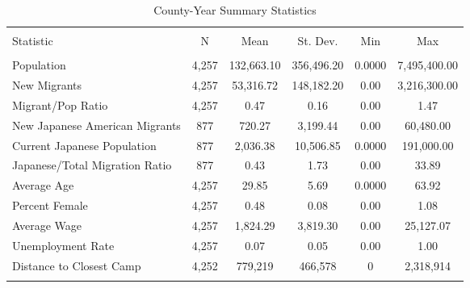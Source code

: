 
\begin{table}[!htbp] \centering 
  \caption{County-Year Summary Statistics} 
  \label{ctysumstats} 
\begin{tabular}{@{\extracolsep{5pt}}lccccc} 
\\[-1.8ex]\hline 
\hline \\[-1.8ex] 
Statistic & \multicolumn{1}{c}{N} & \multicolumn{1}{c}{Mean} & \multicolumn{1}{c}{St. Dev.} & \multicolumn{1}{c}{Min} & \multicolumn{1}{c}{Max} \\ 
\hline \\[-1.8ex] 
Population & 4,257 & 132,663.10 & 356,496.20 & 0.0000 & 7,495,400.00 \\ 
New Migrants & 4,257 & 53,316.72 & 148,182.20 & 0.00 & 3,216,300.00 \\ 
Migrant/Pop Ratio & 4,257 & 0.47 & 0.16 & 0.00 & 1.47 \\ 
New Japanese American Migrants & 877 & 720.27 & 3,199.44 & 0.00 & 60,480.00 \\ 
Current Japanese Population & 877 & 2,036.38 & 10,506.85 & 0.0000 & 191,000.00 \\ 
Japanese/Total Migration Ratio & 877 & 0.43 & 1.73 & 0.00 & 33.89 \\ 
Average Age & 4,257 & 29.85 & 5.69 & 0.0000 & 63.92 \\ 
Percent Female & 4,257 & 0.48 & 0.08 & 0.00 & 1.08 \\ 
Average Wage & 4,257 & 1,824.29 & 3,819.30 & 0.00 & 25,127.07 \\ 
Unemployment Rate & 4,257 & 0.07 & 0.05 & 0.00 & 1.00 \\ 
Distance to Closest Camp & 4,252 & 779,219 & 466,578 & 0 & 2,318,914\\ 
\hline \\[-1.8ex] 
\end{tabular} 
\end{table} 
